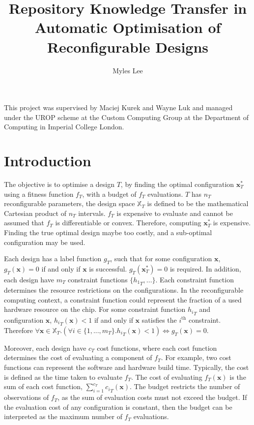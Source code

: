\documentclass[10pt,a4paper]{article}
\author{Myles Lee}
\title{Repository Knowledge Transfer in Automatic Optimisation of
Reconfigurable Designs}
\begin{document}
\maketitle
This project was supervised by Maciej Kurek and Wayne Luk and managed under the UROP scheme at the Custom Computing Group at the Department of Computing in Imperial College London.

\section{Introduction}
The objective is to optimise a design $T$, by finding the optimal configuration $\mathbf{x}_T^*$ using a fitness function $f_T$, with a budget of $f_T$ evaluations. $T$ has $n_T$ reconfigurable parameters, the design space $\mathbb{X}_T$ is defined to be the mathematical Cartesian product of $n_T$ intervals. $f_T$ is expensive to evaluate and cannot be assumed that $f_T$ is differentiable or convex. Therefore, computing $\mathbf{x}_T^*$ is expensive. Finding the true optimal design maybe too costly, and a sub-optimal configuration may be used.

Each design has a label function $g_T$, such that for some configuration $\mathbf{x}$, $g_T(\mathbf{x})=0$ if and only if $\mathbf{x}$ is successful. $g_T(\mathbf{x}_T^*)=0$ is required. In addition, each design have $m_T$ constraint functions $\{{h_1}_T,...\}$. Each constraint function determines the resource restrictions on the configurations. In the reconfigurable computing context, a constraint function could represent the fraction of a used hardware resource on the chip. For some constraint function ${h_i}_T$ and configuration $\mathbf{x}$, ${h_i}_T(\mathbf{x})<1$ if and only if $\mathbf{x}$ satisfies the $i^{\text{th}}$ constraint. Therefore $\forall \mathbf{x}\in\mathbb{X}_T.(\forall i\in\{1,...,m_T\}.{h_i}_T(\mathbf{x})<1)\Leftrightarrow g_T(\mathbf{x})=0$.

Moreover, each design have $c_T$ cost functions, where each cost function determines the cost of evaluating a component of $f_T$. For example, two cost functions can represent the software and hardware build time. Typically, the cost is defined as the time taken to evaluate $f_T$. The cost of evaluating $f_T(\mathbf{x})$ is the sum of each cost function, $\sum_{i=1}^{c_T}{c_i}_T(\mathbf{x})$. The budget restricts the number of observations of $f_T$, as the sum of evaluation costs must not exceed the budget. If the evaluation cost of any configuration is constant, then the budget can be interpreted as the maximum number of $f_T$ evaluations.
\end{document}
